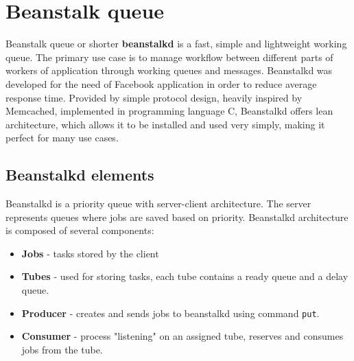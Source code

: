 \section{Beanstalk queue}

    Beanstalk queue or shorter \textbf{beanstalkd} is a fast, simple and lightweight working queue\cite{beanstalkdOfficial}. The primary use case is to manage workflow between different parts of workers of application through working queues and messages. Beanstalkd was developed for the need of Facebook application in order to reduce average response time\cite{beanstalkdOfficial}. Provided by simple protocol design, heavily inspired by Memcached, implemented in programming language C, Beanstalkd offers lean architecture, which allows it to be installed and used very simply, making it perfect for many use cases\cite{beanstalkdInstall}.


    \subsection{Beanstalkd elements}
    Beanstalkd is a priority queue with server-client architecture. The server represents queues where jobs are saved based on priority. Beanstalkd architecture is composed of several components:
    \begin{itemize}
        \item \textbf{Jobs} - tasks stored by the client
        \item \textbf{Tubes} - used for storing tasks, each tube contains a ready queue and a delay queue.
        \item \textbf{Producer} - creates and sends jobs to beanstalkd using command \texttt{put}.
        \item \textbf{Consumer} - process "listening" on an assigned tube, reserves and consumes jobs from the tube.
    \end{itemize}

